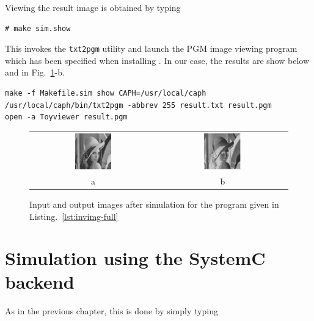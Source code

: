 Viewing the result image is obtained by typing

\begin{lstlisting}[style=BashInputStyle]
# make sim.show
\end{lstlisting}

This invokes the \verb|txt2pgm| utility and launch the PGM image viewing program which has been
specified when installing \caph. In our case, the results are show below and in
Fig.~\ref{fig:inv-result}-b.

\begin{lstlisting}[style=BashOutputStyle]
make -f Makefile.sim show CAPH=/usr/local/caph
/usr/local/caph/bin/txt2pgm -abbrev 255 result.txt result.pgm
open -a Toyviewer result.pgm
\end{lstlisting}

\begin{figure}[htbp]
  \centering
  \begin{tabular}[c]{cc}
 \includegraphics[width=0.3\textwidth]{./figs/lena128.pdf} &
 \includegraphics[width=0.3\textwidth]{./figs/inv-result.pdf} \\
 a & b
  \end{tabular}
  \caption{Input and output images after simulation for the program given in Listing.~\ref{lst:invimg-full}}
  \label{fig:inv-result}
\end{figure}

\section{Simulation using the SystemC backend}
\label{sec:simul-using-sysc-2}

As in the previous chapter, this is done by simply typing 

